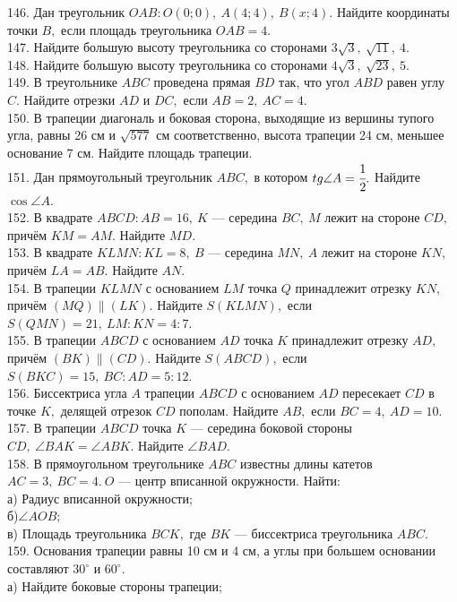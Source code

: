 \documentclass[12pt]{article}
\begin{document}
146. Дан треугольник $OAB: O(0;0),\ A(4;4),\ B(x;4).$ Найдите координаты точки $B,$ если площадь треугольника $OAB=4.$\\
147. Найдите большую высоту треугольника со сторонами $3\sqrt{3},\ \sqrt{11},\ 4.$\\
148. Найдите большую высоту треугольника со сторонами $4\sqrt{3},\ \sqrt{23},\ 5.$\\
149. В треугольнике $ABC$ проведена прямая $BD$ так, что угол $ABD$ равен углу $C.$ Найдите отрезки $AD$ и $DC,$ если $AB=2,\ AC=4.$\\
150. В трапеции диагональ и боковая сторона, выходящие из вершины тупого угла, равны 26 см и $\sqrt{577}$ см соответственно, высота трапеции 24 см, меньшее основание 7 см. Найдите площадь трапеции.\\
151. Дан прямоугольный треугольник $ABC,$ в котором $tg\angle A=\cfrac{1}{2}.$ Найдите $\cos \angle A.$\\
152. В квадрате $ABCD: AB=16,\ K$ --- середина $BC,\ M$ лежит на стороне $CD,$ причём $KM=AM.$ Найдите $MD.$\\
153. В квадрате $KLMN: KL=8,\ B$ --- середина $MN,\ A$ лежит на стороне $KN,$ причём $LA=AB.$ Найдите $AN.$\\
154. В трапеции $KLMN$ с основанием $LM$ точка $Q$ принадлежит отрезку $KN,$ причём $(MQ)\parallel(LK).$ Найдите $S(KLMN),$ если $S(QMN)=21,\ LM:KN=4:7.$\\
155. В трапеции $ABCD$ с основанием $AD$ точка $K$ принадлежит отрезку $AD,$ причём $(BK)\parallel(CD).$ Найдите $S(ABCD),$ если $S(BKC)=15,\ BC:AD=5:12.$\\
156. Биссектриса угла $A$ трапеции $ABCD$ с основанием $AD$ пересекает $CD$ в точке $K,$ делящей отрезок $CD$ пополам. Найдите $AB,$ если $BC=4,\ AD=10.$\\
157. В трапеции $ABCD$ точка $K$ --- середина боковой стороны $CD,\ \angle BAK=\angle ABK.$ Найдите $\angle BAD.$\\
158. В прямоугольном треугольнике $ABC$ известны длины катетов $AC=3,\ BC=4.\ O$ --- центр вписанной окружности. Найти:\\
а) Радиус вписанной окружности;\\
б)$\angle AOB;$\\
в) Площадь треугольника $BCK,$ где $BK$ --- биссектриса треугольника $ABC.$\\
159. Основания трапеции равны 10 см и 4 см, а углы при большем основании составляют $30^\circ$ и $60^\circ.$\\
а) Найдите боковые стороны трапеции;\\
\end{document}
